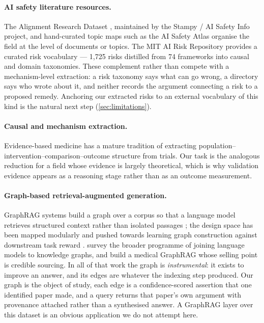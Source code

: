 \documentclass[10pt,twocolumn,letterpaper]{article}
\begin{document}
\paragraph{AI safety literature resources.}
The Alignment Research Dataset \citep{kirchner2022ard}, maintained by the Stampy /
AI Safety Info project, and hand-curated topic maps such as the AI Safety Atlas
organise the field at the level of documents or topics. The MIT AI Risk Repository
\citep{slattery2026airisk} provides a curated risk vocabulary --- 1{,}725 risks
distilled from 74 frameworks into causal and domain taxonomies. These complement
rather than compete with a mechanism-level extraction: a risk taxonomy says what
can go wrong, a directory says who wrote about it, and neither records the
argument connecting a risk to a proposed remedy. Anchoring our extracted risks to
an external vocabulary of this kind is the natural next step
(\cref{sec:limitations}).

\paragraph{Causal and mechanism extraction.}
Evidence-based medicine has a mature tradition of extracting
population--intervention--comparison--outcome structure from trials. Our task is
the analogous reduction for a field whose evidence is largely theoretical, which
is why validation evidence appears as a reasoning stage rather than as an outcome
measurement.

\paragraph{Graph-based retrieval-augmented generation.}
GraphRAG systems build a graph over a corpus so that a language model retrieves
structured context rather than isolated passages
\citep{peng2024graphrag,sarmah2024hybridrag}; the design space has been mapped
modularly \citep{cao2024legographrag} and pushed towards learning graph
construction against downstream task reward \citep{tsang2025autographr1}.
\citet{pan2024unifying} survey the broader programme of joining language models to
knowledge graphs, and \citet{wu2025medgraphrag} build a medical GraphRAG whose
selling point is credible sourcing. In all of that work the graph is
\emph{instrumental}: it exists to improve an answer, and its edges are whatever
the indexing step produced. Our graph is the object of study, each edge is a
confidence-scored assertion that one identified paper made, and a query returns
that paper's own argument with provenance attached rather than a synthesised
answer. A GraphRAG layer over this dataset is an obvious application we do not
attempt here.
\end{document}
